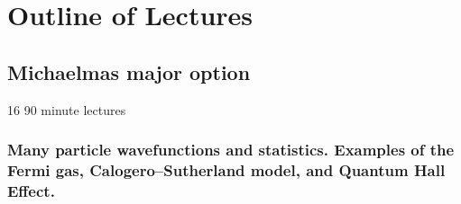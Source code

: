 \section{Outline of Lectures}

\subsection{Michaelmas major option}

16 90 minute lectures

\subsubsection{Many particle wavefunctions and statistics. Examples of the Fermi gas, Calogero--Sutherland model, and Quantum Hall Effect.}


